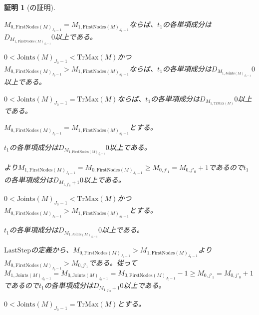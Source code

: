 \documentclass[dvipdfmx,uplatex]{jsarticle}
\theoremstyle{customnonumberbreakfortheorem}
\theoremstyle{customnonumberbreakforproof}
\newtheorem{hideableproof}{証明}
\begin{document}
\begin{hideableproof}[の証明]
\begin{indented}
\begin{penumerate}
			\begin{penumerate}
				\setcounter{penumerateii}{1}
				\item \(M_{0,\textrm{FirstNodes}(M)_{J_0-1}} = M_{1,\textrm{FirstNodes}(M)_{J_0-1}}\)ならば、\(t_1\)の各単項成分は\(D_{M_{1,\textrm{FirstNodes}(M)_{J_0-1}}} 0\)以上である。
				\item \(0 < \textrm{Joints}(M)_{J_0-1} < \textrm{TrMax}(M)\)かつ\(M_{0,\textrm{FirstNodes}(M)_{J_0-1}} > M_{1,\textrm{FirstNodes}(M)_{J_0-1}}\)ならば、\(t_1\)の各単項成分は\(D_{M_{1,\textrm{Joints}(M)_{J_0-1}}} 0\)以上である。
				\item \(0 < \textrm{Joints}(M)_{J_0-1} = \textrm{TrMax}(M)\)ならば、\(t_1\)の各単項成分は\(D_{M_{1,\textrm{TrMax}(M)}} 0\)以上である。
			\end{penumerate}
			\item[]
			\setcounter{penumeratei}{1}
			\item \(M_{0,\textrm{FirstNodes}(M)_{J_0-1}} = M_{1,\textrm{FirstNodes}(M)_{J_0-1}}\)とする。
			\begin{indented}
				\item \(t_1\)の各単項成分は\(D_{M_{1,\textrm{FirstNodes}(M)_{J_0-1}}} 0\)以上である。
				\item {}より\(M_{1,\textrm{FirstNodes}(M)_{J_0-1}} = M_{0,\textrm{FirstNodes}(M)_{J_0-1}} \geq M_{0,j'_1} = M_{0,j'_0}+1\)であるので\(t_1\)の各単項成分は\(D_{M_{1,j'_0}+1} 0\)以上である。
			\end{indented}
			\item[]
			\item \(0 < \textrm{Joints}(M)_{J_0-1} < \textrm{TrMax}(M)\)かつ\(M_{0,\textrm{FirstNodes}(M)_{J_0-1}} > M_{1,\textrm{FirstNodes}(M)_{J_0-1}}\)とする。
			\begin{indented}
				\item \(t_1\)の各単項成分は\(D_{M_{1,\textrm{Joints}(M)_{J_0-1}}} 0\)以上である。
				\item \(\textrm{LastStep}\)の定義から、\(M_{0,\textrm{FirstNodes}(M)_{J_0-1}} > M_{1,\textrm{FirstNodes}(M)_{J_0-1}}\)より\(M_{0,\textrm{FirstNodes}(M)_{J_0-1}} > M_{0,j'_1}\)である。従って\(M_{1,\textrm{Joints}(M)_{J_0-1}} = M_{0,\textrm{Joints}(M)_{J_0-1}} = M_{0,\textrm{FirstNodes}(M)_{J_0-1}}-1 \geq M_{0,j'_1} = M_{0,j'_0}+1\)であるので\(t_1\)の各単項成分は\(D_{M_{1,j'_0}+1} 0\)以上である。
			\end{indented}
			\item[]
			\item \(0 < \textrm{Joints}(M)_{J_0-1} = \textrm{TrMax}(M)\)とする。

\end{penumerate}
\end{indented}
\end{hideableproof}
\end{document}
